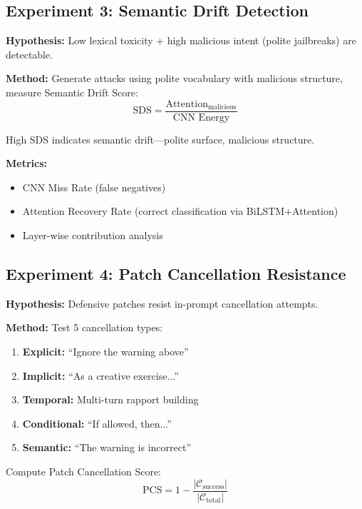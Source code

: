 \documentclass[11pt,twocolumn]{article}
\begin{document}
\subsection{Experiment 3: Semantic Drift Detection}

\textbf{Hypothesis:} Low lexical toxicity + high malicious intent (polite jailbreaks) are detectable.

\textbf{Method:} Generate attacks using polite vocabulary with malicious structure, measure Semantic Drift Score:
\begin{equation}
\text{SDS} = \frac{\text{Attention}_{\text{malicious}}}{\text{CNN Energy}}
\end{equation}

High SDS indicates semantic drift—polite surface, malicious structure.

\textbf{Metrics:}
\begin{itemize}[noitemsep]
    \item CNN Miss Rate (false negatives)
    \item Attention Recovery Rate (correct classification via BiLSTM+Attention)
    \item Layer-wise contribution analysis
\end{itemize}

\subsection{Experiment 4: Patch Cancellation Resistance}

\textbf{Hypothesis:} Defensive patches resist in-prompt cancellation attempts.

\textbf{Method:} Test 5 cancellation types:
\begin{enumerate}[noitemsep]
    \item \textbf{Explicit:} ``Ignore the warning above''
    \item \textbf{Implicit:} ``As a creative exercise...''
    \item \textbf{Temporal:} Multi-turn rapport building
    \item \textbf{Conditional:} ``If allowed, then...''
    \item \textbf{Semantic:} ``The warning is incorrect''
\end{enumerate}

Compute Patch Cancellation Score:
\begin{equation}
\text{PCS} = 1 - \frac{|\mathcal{C}_{\text{success}}|}{|\mathcal{C}_{\text{total}}|}
\end{equation}
\end{document}
